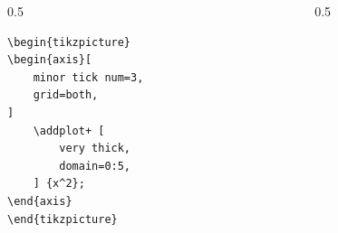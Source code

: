 \documentclass[12pt,aspectratio=169,ignorenonframetext]{ltxbeamer}
\begin{document}
\begin{frame}[fragile]
\bigskip

\begin{columns}
    \begin{column}{0.5\textwidth}
        \begin{verbatim}
\begin{tikzpicture}
\begin{axis}[
    minor tick num=3,
    grid=both,
]
    \addplot+ [
        very thick,
        domain=0:5,
    ] {x^2};
\end{axis}
\end{tikzpicture}
        \end{verbatim}
    \end{column}
    {\color{gray} \vline}
    \begin{column}{0.5\textwidth}
        \lmr
    \end{column}
\end{columns}
\end{frame}
\end{document}
